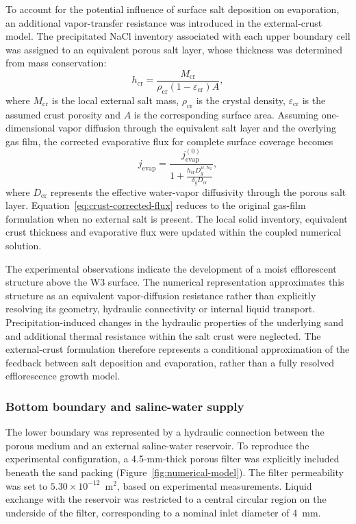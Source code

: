 \documentclass[final]{agujournal2019}
\begin{document}
To account for the potential influence of surface salt deposition on
evaporation, an additional vapor-transfer resistance was introduced in the
external-crust model. The precipitated NaCl inventory associated with each upper
boundary cell was assigned to an equivalent porous salt layer, whose thickness
was determined from mass conservation:
\begin{equation}
h_{\mathrm{cr}} =
\frac{M_{\mathrm{cr}}}
{\rho_{\mathrm{cr}}(1-\varepsilon_{\mathrm{cr}})A},
\label{eq:crust-thickness}
\end{equation}
where $M_{\mathrm{cr}}$ is the local external salt mass,
$\rho_{\mathrm{cr}}$ is the crystal density, $\varepsilon_{\mathrm{cr}}$ is the
assumed crust porosity and $A$ is the corresponding surface area. Assuming
one-dimensional vapor diffusion through the equivalent salt layer and the
overlying gas film, the corrected evaporative flux for complete surface
coverage becomes
\begin{equation}
j_{\mathrm{evap}} =
\frac{j_{\mathrm{evap}}^{(0)}}
{1+\displaystyle\frac{h_{\mathrm{cr}}D_g^{w,\mathrm{N_2}}}
{\delta_g D_{\mathrm{cr}}}},
\label{eq:crust-corrected-flux}
\end{equation}
where $D_{\mathrm{cr}}$ represents the effective water-vapor diffusivity through
the porous salt layer. Equation~\ref{eq:crust-corrected-flux} reduces to the
original gas-film formulation when no external salt is present. The local solid
inventory, equivalent crust thickness and evaporative flux were updated within
the coupled numerical solution.

The experimental observations indicate the development of a moist
efflorescent structure above the W3 surface. The numerical representation
approximates this structure as an equivalent vapor-diffusion resistance rather
than explicitly resolving its geometry, hydraulic connectivity or internal
liquid transport. Precipitation-induced changes in the hydraulic properties of
the underlying sand and additional thermal resistance within the salt crust
were neglected. The external-crust formulation therefore represents a
conditional approximation of the feedback between salt deposition and
evaporation, rather than a fully resolved efflorescence growth model.

\subsubsection{Bottom boundary and saline-water supply}

The lower boundary was represented by a hydraulic connection between the porous
medium and an external saline-water reservoir. To reproduce the experimental
configuration, a 4.5-mm-thick porous filter was explicitly included beneath the
sand packing (Figure~\ref{fig:numerical-model}). The filter permeability was set
to $5.30\times10^{-12}$~m$^2$, based on experimental measurements. Liquid
exchange with the reservoir was restricted to a central circular region on the
underside of the filter, corresponding to a nominal inlet diameter of 4~mm.
\end{document}
